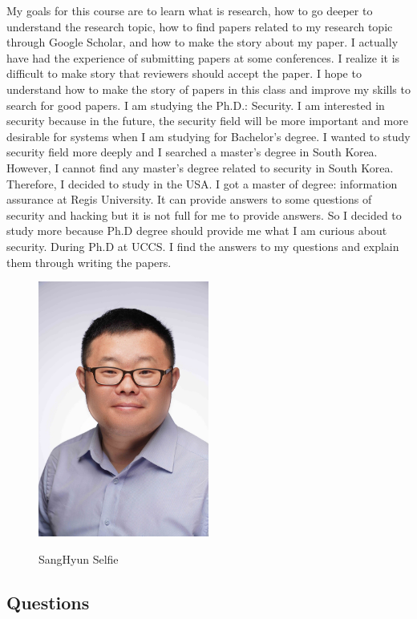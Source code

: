 \documentclass{article}
\begin{document}
My goals for this course are to learn what is research, how to go deeper to understand the research topic, how to find papers related to my research topic through Google Scholar, and how to make the story about my paper. I actually have had the experience of submitting papers at some conferences. I realize it is difficult to make story that reviewers should accept the paper. I hope to understand how to make the story of papers in this class and improve my skills to search for good papers. I am studying the Ph.D.: Security. I am interested in security because in the future, the security field will be more important and more desirable for systems when I am studying for Bachelor’s degree. I wanted to study security field more deeply and I searched a master's degree in South Korea. However, I cannot find any master's degree related to security in South Korea. Therefore, I decided to study in the USA. I got a master of degree: information assurance at Regis University. It can provide answers to some questions of security and hacking but it is not full for me to provide answers. So I decided to study more because Ph.D degree should provide me what I am curious about security. During Ph.D at UCCS. I find the answers to my questions and explain them through writing the papers. 
\begin{figure}[t]
\centering
{\includegraphics [width=0.5\textwidth]{sang}}
\caption{SangHyun Selfie 
}
\label{fig:SPSC}
\end{figure}



\subsection{Questions}
\end{document}
